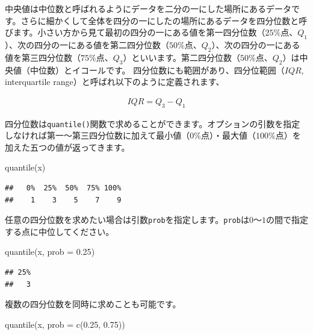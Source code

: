 \documentclass[
  12pt,
]{book}
\newenvironment{Shaded}{\begin{snugshade}}{\end{snugshade}}
\newcommand{\AttributeTok}[1]{\textcolor[rgb]{0.77,0.63,0.00}{#1}}
\newcommand{\FloatTok}[1]{\textcolor[rgb]{0.00,0.00,0.81}{#1}}
\newcommand{\FunctionTok}[1]{\textcolor[rgb]{0.00,0.00,0.00}{#1}}
\newcommand{\NormalTok}[1]{#1}
\begin{document}
中央値は中位数と呼ばれるようにデータを二分の一にした場所にあるデータです。さらに細かくして全体を四分の一にしたの場所にあるデータを四分位数と呼びます。小さい方から見て最初の四分の一にある値を第一四分位数（\(25\%\)点、\(Q_1\)）、次の四分の一にある値を第二四分位数（\(50\%\)点、\(Q_2\)）、次の四分の一にある値を第三四分位数（\(75\%\)点、\(Q_3\)）といいます。第二四分位数（\(50\%\)点、\(Q_2\)）は中央値（中位数）とイコールです。 四分位数にも範囲があり、四分位範囲（\(IQR\), interquartile range）と呼ばれ以下のように定義されます、

\begin{align}
  IQR = Q_3 - Q_1 \label{eq:IQR}
\end{align}

四分位数は\texttt{quantile()}関数で求めることができます。オプションの引数を指定しなければ第一〜第三四分位数に加えて最小値（\(0\%点\)）・最大値（\(100\%点\)）を加えた五つの値が返ってきます。

\begin{Shaded}
\begin{Highlighting}[numbers=left,,]
\FunctionTok{quantile}\NormalTok{(x)}
\end{Highlighting}
\end{Shaded}

\begin{verbatim}
##   0%  25%  50%  75% 100% 
##    1    3    5    7    9
\end{verbatim}

任意の四分位数を求めたい場合は引数\texttt{prob}を指定します。\texttt{prob}は\(0\)〜\(1\)の間で指定する点に中位してください。

\begin{Shaded}
\begin{Highlighting}[numbers=left,,]
\FunctionTok{quantile}\NormalTok{(x, }\AttributeTok{prob =} \FloatTok{0.25}\NormalTok{)}
\end{Highlighting}
\end{Shaded}

\begin{verbatim}
## 25% 
##   3
\end{verbatim}

複数の四分位数を同時に求めことも可能です。

\begin{Shaded}
\begin{Highlighting}[numbers=left,,]
\FunctionTok{quantile}\NormalTok{(x, }\AttributeTok{prob =} \FunctionTok{c}\NormalTok{(}\FloatTok{0.25}\NormalTok{, }\FloatTok{0.75}\NormalTok{))}
\end{Highlighting}
\end{Shaded}
\end{document}
